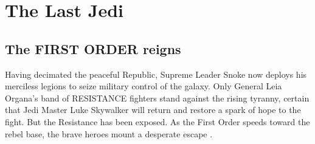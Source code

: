 \chapter{The Last Jedi}
\section{The FIRST ORDER reigns}
Having decimated the peaceful Republic, Supreme Leader Snoke 
now deploys his merciless legions to seize military control 
of the galaxy. Only General Leia Organa's band of RESISTANCE 
fighters stand against the rising tyranny, certain that Jedi 
Master Luke Skywalker will return and restore a spark of hope 
to the fight. But the Resistance has been exposed. As the 
First Order speeds toward the rebel base, the brave heroes 
mount a desperate escape \cite{bib_chirrut17, bib_rey17}.

\lipsum[1-10]
